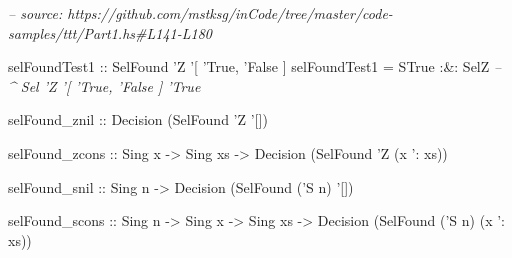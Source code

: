 \documentclass[]{article}
\newenvironment{Shaded}{}{}
\newcommand{\CommentTok}[1]{\textcolor[rgb]{0.38,0.63,0.69}{\textit{#1}}}
\newcommand{\DataTypeTok}[1]{\textcolor[rgb]{0.56,0.13,0.00}{#1}}
\newcommand{\FunctionTok}[1]{\textcolor[rgb]{0.02,0.16,0.49}{#1}}
\newcommand{\NormalTok}[1]{#1}
\newcommand{\OtherTok}[1]{\textcolor[rgb]{0.00,0.44,0.13}{#1}}
\begin{document}
\begin{Shaded}
\begin{Highlighting}[]
\CommentTok{-- source: https://github.com/mstksg/inCode/tree/master/code-samples/ttt/Part1.hs#L141-L180}

\OtherTok{selFoundTest1 ::} \DataTypeTok{SelFound}\NormalTok{ '}\DataTypeTok{Z}\NormalTok{ '[ '}\DataTypeTok{True}\NormalTok{, '}\DataTypeTok{False}\NormalTok{ ]}
\NormalTok{selFoundTest1 }\FunctionTok{=} \DataTypeTok{STrue} \FunctionTok{:&:} \DataTypeTok{SelZ}
                       \CommentTok{-- ^ Sel 'Z '[ 'True, 'False ] 'True}

\NormalTok{selFound_znil}
\OtherTok{    ::} \DataTypeTok{Decision}\NormalTok{ (}\DataTypeTok{SelFound}\NormalTok{ '}\DataTypeTok{Z}\NormalTok{ '[])}

\NormalTok{selFound_zcons}
\OtherTok{    ::} \DataTypeTok{Sing}\NormalTok{ x}
    \OtherTok{->} \DataTypeTok{Sing}\NormalTok{ xs}
    \OtherTok{->} \DataTypeTok{Decision}\NormalTok{ (}\DataTypeTok{SelFound}\NormalTok{ '}\DataTypeTok{Z}\NormalTok{ (x '}\FunctionTok{:}\NormalTok{ xs))}

\NormalTok{selFound_snil}
\OtherTok{    ::} \DataTypeTok{Sing}\NormalTok{ n}
    \OtherTok{->} \DataTypeTok{Decision}\NormalTok{ (}\DataTypeTok{SelFound}\NormalTok{ ('}\DataTypeTok{S}\NormalTok{ n) '[])}

\NormalTok{selFound_scons}
\OtherTok{    ::} \DataTypeTok{Sing}\NormalTok{ n}
    \OtherTok{->} \DataTypeTok{Sing}\NormalTok{ x}
    \OtherTok{->} \DataTypeTok{Sing}\NormalTok{ xs}
    \OtherTok{->} \DataTypeTok{Decision}\NormalTok{ (}\DataTypeTok{SelFound}\NormalTok{ ('}\DataTypeTok{S}\NormalTok{ n) (x '}\FunctionTok{:}\NormalTok{ xs))}
\end{Highlighting}
\end{Shaded}
\end{document}
